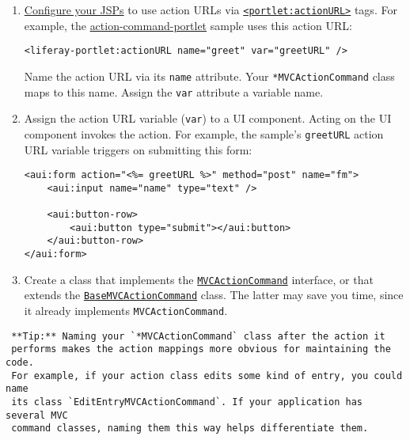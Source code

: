 \begin{enumerate}
\def\labelenumi{\arabic{enumi}.}
\item
  \href{/docs/7-2/appdev/-/knowledge_base/a/configuring-the-view-layer}{Configure
  your JSPs} to use action URLs via
  \href{https://docs.liferay.com/dxp/portal/7.2-latest/taglibs/util-taglib/portlet/actionURL.html}{\texttt{\textless{}portlet:actionURL\textgreater{}}}
  tags. For example, the
  \href{https://github.com/liferay/liferay-blade-samples/blob/7.1/gradle/apps/action-command-portlet/src/main/resources/META-INF/resources/view.jsp}{action-command-portlet}
  sample uses this action URL:

\begin{verbatim}
<liferay-portlet:actionURL name="greet" var="greetURL" />
\end{verbatim}

  Name the action URL via its \texttt{name} attribute. Your
  \texttt{*MVCActionCommand} class maps to this name. Assign the
  \texttt{var} attribute a variable name.
\item
  Assign the action URL variable (\texttt{var}) to a UI component.
  Acting on the UI component invokes the action. For example, the
  sample's \texttt{greetURL} action URL variable triggers on submitting
  this form:

\begin{verbatim}
<aui:form action="<%= greetURL %>" method="post" name="fm">
    <aui:input name="name" type="text" />

    <aui:button-row>
        <aui:button type="submit"></aui:button>
    </aui:button-row>
</aui:form>
\end{verbatim}
\item
  Create a class that implements the
  \href{https://docs.liferay.com/dxp/portal/7.2-latest/javadocs/portal-kernel/com/liferay/portal/kernel/portlet/bridges/mvc/MVCActionCommand.html}{\texttt{MVCActionCommand}}
  interface, or that extends the
  \href{https://docs.liferay.com/dxp/portal/7.2-latest/javadocs/portal-kernel/com/liferay/portal/kernel/portlet/bridges/mvc/BaseMVCActionCommand.html}{\texttt{BaseMVCActionCommand}}
  class. The latter may save you time, since it already implements
  \texttt{MVCActionCommand}.
\end{enumerate}

\noindent\hrulefill

\begin{verbatim}
 **Tip:** Naming your `*MVCActionCommand` class after the action it 
 performs makes the action mappings more obvious for maintaining the code.
 For example, if your action class edits some kind of entry, you could name
 its class `EditEntryMVCActionCommand`. If your application has several MVC
 command classes, naming them this way helps differentiate them. 
\end{verbatim}

